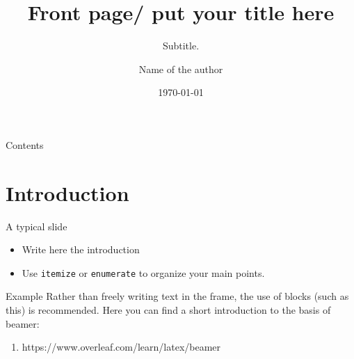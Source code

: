 \documentclass[aspectratio=169]{beamer}
\title[Your Short Title]{Front page/ put your title here}
\subtitle{Subtitle.}
\author{Name of the author}
\date{\today}
\begin{document}
	\maketitle
	\begin{frame}{Contents}
		\tableofcontents
	\end{frame}

	\section{Introduction}
	\begin{frame}{A typical slide}
		\begin{itemize}
			\item Write here the introduction
			\item Use \texttt{itemize} or \texttt{enumerate} to organize your main points.
		\end{itemize}
		\begin{block}{Example}
			Rather than freely writing text in the frame, the use of blocks (such as this) is recommended.
			Here you can find a short introduction to the basis of beamer:
			\begin{enumerate}
				\item https://www.overleaf.com/learn/latex/beamer
			\end{enumerate}
		\end{block}
	\end{frame}
\end{document}
